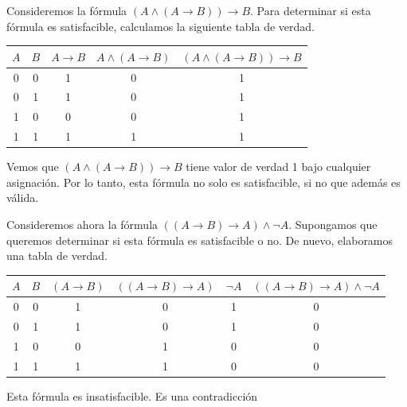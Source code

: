 \message{ !name(main.tex)}\documentclass[12pt,a4paper]{book}
\begin{document}
    \begin{ejemplo}
        Consideremos la fórmula $(A\wedge(A\rightarrow B))\rightarrow B$. Para determinar si esta fórmula es satisfacible, calculamos la siguiente tabla
        de verdad.

        \begin{table}[htbp]
            \centering
            \renewcommand{\arraystretch}{1.5}
            \setlength{\tabcolsep}{10pt}
            \begin{tabular}{c | c | c | c | c}
                $A$ & $B$ & $A\rightarrow B$ & $A\wedge(A\rightarrow B)$ & $(A\wedge(A\rightarrow B))\rightarrow B$\\
                \hline
                0 & 0 & 1 & 0 & 1\\
                0 & 1 & 1 & 0 & 1\\
                1 & 0 & 0 & 0 & 1\\
                1 & 1 & 1 & 1 & 1
            \end{tabular}
        \end{table}

        Vemos que $(A\wedge(A\rightarrow B))\rightarrow B$ tiene valor de verdad 1 bajo cualquier asignación. Por lo tanto, esta fórmula no solo es
        satisfacible, si no que además es válida.
    \end{ejemplo}

    \vspace{2.4cm}

    \begin{ejemplo}
        Consideremos ahora la fórmula $((A\rightarrow B)\rightarrow A)\wedge\neg A$. Supongamos que queremos determinar si esta fórmula es satisfacible o no.
        De nuevo, elaboramos una tabla de verdad.

        \begin{table}[htbp]
            \centering
            \renewcommand{\arraystretch}{1.5}
            \setlength{\tabcolsep}{10pt}
            \begin{tabular}{c | c | c | c | c | c}
                $A$ & $B$ & $(A\rightarrow B)$ & $((A\rightarrow B)\rightarrow A)$ & $\neg A$ & $((A\rightarrow B)\rightarrow A)\wedge\neg A$\\
                \hline
                0 & 0 & 1 & 0 & 1 & 0 \\
                0 & 1 & 1 & 0 & 1 & 0 \\
                1 & 0 & 0 & 1 & 0 & 0 \\
                1 & 1 & 1 & 1 & 0 & 0
            \end{tabular}
        \end{table}

        Esta fórmula es insatisfacible. Es una contradicción
    \end{ejemplo}
\end{document}
